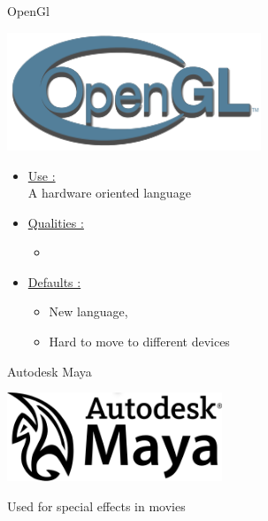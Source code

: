 \documentclass[a4paper,10pt]{beamer}
\begin{document}
			\begin{frame}{OpenGl}
				\begin{multicols}{2}
					\includegraphics[height=100pt]{images/logos/OpenGL_logo.png}\\
					
					\columnbreak 
					
					\begin{itemize}
						\item \underline{Use :}\\		
						A hardware oriented language			
						\item \underline{Qualities :}\\
						\begin{itemize}
							\item 
						\end{itemize}
					\end{itemize}		 
				\end{multicols}
				\begin{itemize}
					\item \underline{Defaults :}\\
					\begin{itemize}
						\item New language, 
						\item Hard to move to different devices
					\end{itemize}
				\end{itemize}
			\end{frame}
			
			\begin{frame}{Autodesk Maya}
				\centerline{\includegraphics[height=75pt]{images/logos/Autodesk_Maya.png}}
				
				Used for special effects in movies
			\end{frame}
			
\end{document}
